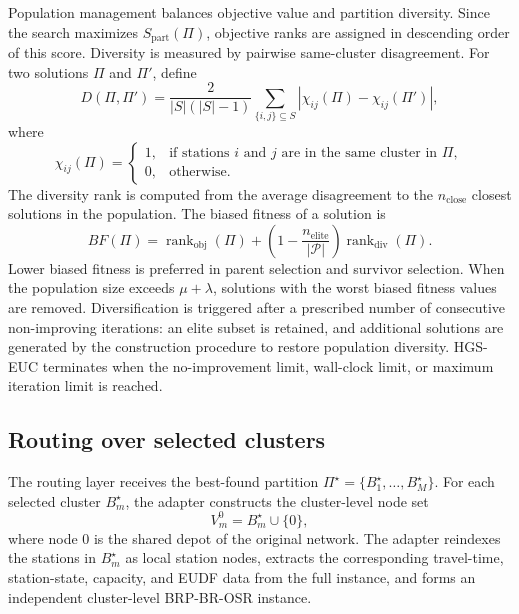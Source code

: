 Population management balances objective value and partition diversity. Since
the search maximizes $S_{\mathrm{part}}(\Pi)$, objective ranks are assigned in
descending order of this score. Diversity is measured by pairwise same-cluster
disagreement. For two solutions $\Pi$ and $\Pi'$, define
\begin{equation}
D(\Pi,\Pi')=
\frac{2}{|S|(|S|-1)}
\sum_{\{i,j\}\subseteq S}
\left|\chi_{ij}(\Pi)-\chi_{ij}(\Pi')\right|,
\label{eq:partition-disagreement}
\end{equation}
where
\begin{equation}
\chi_{ij}(\Pi)=
\begin{cases}
1, & \text{if stations } i \text{ and } j \text{ are in the same cluster in } \Pi,\\
0, & \text{otherwise.}
\end{cases}
\label{eq:same-cluster-indicator}
\end{equation}
The diversity rank is computed from the average disagreement to the
$n_{\mathrm{close}}$ closest solutions in the population. The biased fitness of a
solution is
\begin{equation}
BF(\Pi)=\operatorname{rank}_{\mathrm{obj}}(\Pi)+
\left(1-\frac{n_{\mathrm{elite}}}{|\mathcal P|}\right)
\operatorname{rank}_{\mathrm{div}}(\Pi).
\label{eq:biased-fitness-hgs-euc}
\end{equation}
Lower biased fitness is preferred in parent selection and survivor selection.
When the population size exceeds $\mu+\lambda$, solutions with the worst biased
fitness values are removed. Diversification is triggered after a prescribed
number of consecutive non-improving iterations: an elite subset is retained, and
additional solutions are generated by the construction procedure to restore
population diversity. HGS-EUC terminates when the no-improvement limit,
wall-clock limit, or maximum iteration limit is reached.

\subsection{Routing over selected clusters}\label{sec:routing-interface}

The routing layer receives the best-found partition
$\Pi^\star=\{B_1^\star,\ldots,B_M^\star\}$. For each selected cluster
$B_m^\star$, the adapter constructs the cluster-level node set
\begin{equation}
V_m^0=B_m^\star\cup\{0\},
\label{eq:cfrs-cluster-node-set}
\end{equation}
where node $0$ is the shared depot of the original network. The adapter reindexes
the stations in $B_m^\star$ as local station nodes, extracts the corresponding
travel-time, station-state, capacity, and EUDF data from the full instance, and
forms an independent cluster-level BRP-BR-OSR instance.

